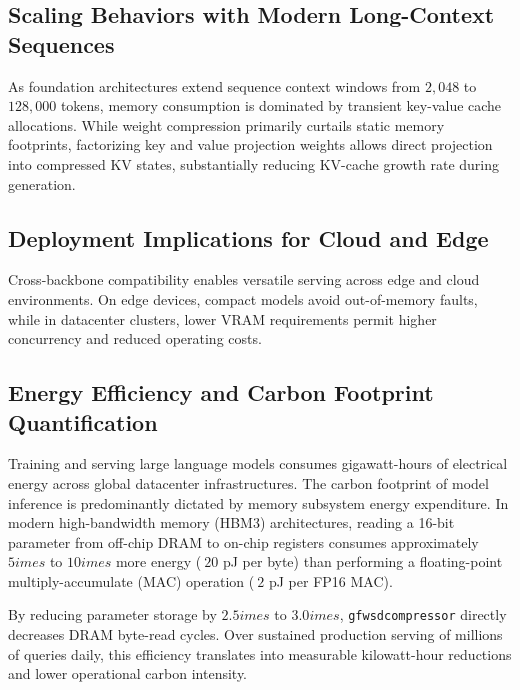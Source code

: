 \subsection{Scaling Behaviors with Modern Long-Context Sequences}
As foundation architectures extend sequence context windows from $2{,}048$ to $128{,}000$ tokens, memory consumption is dominated by transient key-value cache allocations. While weight compression primarily curtails static memory footprints, factorizing key and value projection weights allows direct projection into compressed KV states, substantially reducing KV-cache growth rate during generation.

\subsection{Deployment Implications for Cloud and Edge}
Cross-backbone compatibility enables versatile serving across edge and cloud environments. On edge devices, compact models avoid out-of-memory faults, while in datacenter clusters, lower VRAM requirements permit higher concurrency and reduced operating costs.

\subsection{Energy Efficiency and Carbon Footprint Quantification}
Training and serving large language models consumes gigawatt-hours of electrical energy across global datacenter infrastructures. The carbon footprint of model inference is predominantly dictated by memory subsystem energy expenditure. In modern high-bandwidth memory (HBM3) architectures, reading a 16-bit parameter from off-chip DRAM to on-chip registers consumes approximately $5	imes$ to $10	imes$ more energy ($~20$ pJ per byte) than performing a floating-point multiply-accumulate (MAC) operation ($~2$ pJ per FP16 MAC).

By reducing parameter storage by $2.5	imes$ to $3.0	imes$, \texttt{gfwsdcompressor} directly decreases DRAM byte-read cycles. Over sustained production serving of millions of queries daily, this efficiency translates into measurable kilowatt-hour reductions and lower operational carbon intensity.

